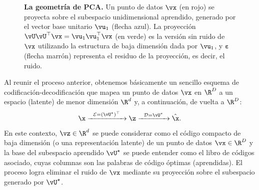 \documentclass[../../book-main.tex]{subfiles}
\begin{document}
\begin{figure}
    \centering
    \caption{\small \textbf{La geometría de PCA.} Un punto de datos $\vx$
        (en rojo) se proyecta sobre el subespacio unidimensional aprendido,
        generado por el vector base unitario $\vu_1$ (flecha azul). La
        proyección $\vU\vU^\top\vx = \vu_{1}\vu_{1}^{\top}\vx$ (en verde) es
        la versión sin ruido de $\vx$ utilizando la estructura de baja dimensión
        dada por $\vu_{1}$, y $\boldsymbol{\varepsilon}$ (flecha marrón)
    representa el residuo de la proyección, es decir, el ruido.} 
    \label{fig:pca-geometry}
\end{figure}

Al reunir el proceso anterior, obtenemos básicamente un sencillo
esquema de codificación-decodificación que mapea un punto de datos $\vx$ en $\R^D$ a un
espacio (latente) de menor dimensión $\R^d$ y, a continuación, de vuelta a $\R^D$:
\begin{equation}
    \x \xrightarrow{\hspace{2mm} \mathcal{E} = (\vU^\star)^\top
    \hspace{2mm}}  \z
    \xrightarrow{\hspace{2mm} \mathcal{D} = \vU^\star \hspace{2mm}}   \hat{\x}.
    \label{eqn:autoencoding-PCA}
\end{equation}
En este contexto, $\vz \in \R^d$ se puede considerar como el código compacto de baja dimensión (o
una representación latente) de un punto de datos  $\vx \in \R^D$ y la base del subespacio
aprendido $\vU^\star$ se puede entender como el libro de códigos asociado, cuyas columnas son las 
palabras de código óptimas (aprendidas). El proceso logra eliminar el ruido de $\vx$ mediante
su proyección sobre el subespacio generado por $\vU^\star$.
\end{document}
